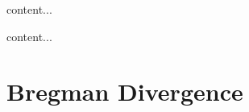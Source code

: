 \documentclass[main.tex]{subfiles}
\begin{document}
\begin{theorem}
	content...
\end{theorem}

\begin{theorem}
	content...
\end{theorem}

\section{Bregman Divergence}
\end{document}
